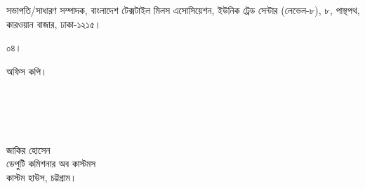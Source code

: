 \documentclass[12pt]{article}
\begin{document}
\begin{minipage}[t]{0.94\linewidth}
সভাপতি/সাধারণ সম্পাদক, বাংলাদেশ টেক্সটাইল
মিলস এসোসিয়েশন, ইউনিক ট্রেড সেন্টার (লেভেল-৮),
৮, পান্থপথ, কারওয়ান বাজার, ঢাকা-১২১৫।
\end{minipage}
\begin{minipage}[t]{0.06\linewidth}
\footnotesize{০৪।}
\end{minipage}
\begin{minipage}[t]{0.94\linewidth}
 অফিস কপি।
 \\
 \\
 \\
 \\
 \\
\end{minipage}
\begin{minipage}[t]{0.60\linewidth}
\hspace{1em}
\end{minipage}
\normalsize
\begin{minipage}[t]{0.40\linewidth}
\begin{center}
জাকির হোসেন
\\
ডেপুটি কমিশনার অব কাস্টমস
\\
কাস্টম হাউস, চট্টগ্রাম।
\end{center}
\end{minipage}
\thispagestyle{slogan}
\end{document}
